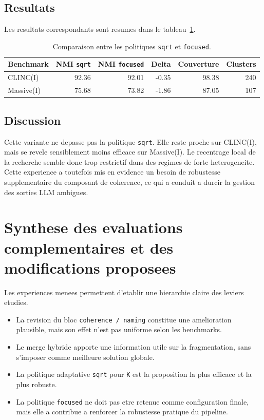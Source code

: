 \subsection{Resultats}

Les resultats correspondants sont resumes dans le
tableau~\ref{tab:fourth-improvement-results}.

\begin{table}[h]
  \centering
  \small
  \begin{tabular}{lrrrrr}
    \toprule
    Benchmark & NMI \texttt{sqrt} & NMI \texttt{focused} & Delta & Couverture & Clusters \\
    \midrule
    CLINC(I) & 92.36 & 92.01 & -0.35 & 98.38 & 240 \\
    Massive(I) & 75.68 & 73.82 & -1.86 & 87.05 & 107 \\
    \bottomrule
  \end{tabular}
  \caption{Comparaison entre les politiques \texttt{sqrt} et \texttt{focused}.}
  \label{tab:fourth-improvement-results}
\end{table}

\subsection{Discussion}

Cette variante ne depasse pas la politique \texttt{sqrt}. Elle reste proche sur
CLINC(I), mais se revele sensiblement moins efficace sur Massive(I). Le
recentrage local de la recherche semble donc trop restrictif dans des regimes
de forte heterogeneite. Cette experience a toutefois mis en evidence un besoin
de robustesse supplementaire du composant de coherence, ce qui a conduit a
durcir la gestion des sorties LLM ambigues.

\section{Synthese des evaluations complementaires et des modifications proposees}

Les experiences menees permettent d'etablir une hierarchie claire des leviers
etudies.
\begin{itemize}[leftmargin=*]
  \item La revision du bloc \texttt{coherence / naming} constitue une
  amelioration plausible, mais son effet n'est pas uniforme selon les
  benchmarks.
  \item Le merge hybride apporte une information utile sur la fragmentation,
  sans s'imposer comme meilleure solution globale.
  \item La politique adaptative \texttt{sqrt} pour \texttt{K} est la proposition
  la plus efficace et la plus robuste.
  \item La politique \texttt{focused} ne doit pas etre retenue comme
  configuration finale, mais elle a contribue a renforcer la robustesse
  pratique du pipeline.
\end{itemize}


